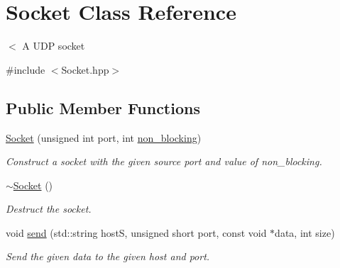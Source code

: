 \hypertarget{classSocket}{}\section{Socket Class Reference}
\label{classSocket}


$<$ A U\+DP socket  




{\ttfamily \#include $<$Socket.\+hpp$>$}

\subsection*{Public Member Functions}
\begin{DoxyCompactItemize}
\item 
\mbox{\label{classSocket_ad584e40f858c7c56d84ffadef63f3ab9}} 
\hyperlink{classSocket_ad584e40f858c7c56d84ffadef63f3ab9}{Socket} (unsigned int port, int \hyperlink{classSocket_ad962ba2bb1875300c69ff5b4e6a70cd1}{non\+\_\+blocking})
\begin{DoxyCompactList}\small\item\em Construct a socket with the given source port and value of non\+\_\+blocking. \end{DoxyCompactList}\item 
\mbox{\label{classSocket_aeac4eb6379a543d38ed88977d3b6630a}} 
\hyperlink{classSocket_aeac4eb6379a543d38ed88977d3b6630a}{$\sim$\+Socket} ()
\begin{DoxyCompactList}\small\item\em Destruct the socket. \end{DoxyCompactList}\item 
\mbox{\label{classSocket_a557ad7665a79556c164e6b30488f70f9}} 
void \hyperlink{classSocket_a557ad7665a79556c164e6b30488f70f9}{send} (std\+::string hostS, unsigned short port, const void $\ast$data, int size)
\begin{DoxyCompactList}\small\item\em Send the given data to the given host and port. \end{DoxyCompactList}\end{DoxyCompactItemize}
